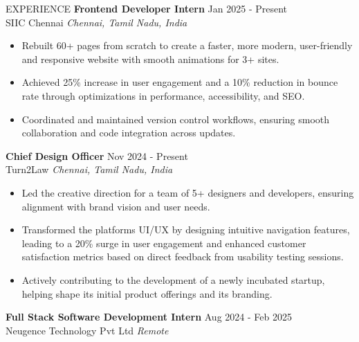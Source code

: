 \documentclass{resume} %
\begin{document}






\begin{rSection}{EXPERIENCE}
    \textbf{Frontend Developer Intern} \hfill Jan 2025 - Present\\
SIIC Chennai \hfill \textit{Chennai, Tamil Nadu, India}


\begin{itemize}
\itemsep -3pt{}
\item Rebuilt 60+ pages from scratch to create a faster, more modern, user-friendly and responsive website with smooth animations for 3+ sites.
\item Achieved 25\% increase in user engagement and a 10\% reduction in bounce rate through optimizations in performance, accessibility, and SEO.
\item Coordinated and maintained version control workflows, ensuring smooth collaboration and code integration across updates.
\end{itemize}
\textbf{Chief Design Officer} \hfill Nov 2024 - Present\\
Turn2Law \hfill \textit{Chennai, Tamil Nadu, India}


\begin{itemize}
\itemsep -3pt{}
\item Led the creative direction for a team of 5+ designers and developers, ensuring alignment with brand vision and user needs.
\item Transformed the platforms UI/UX by designing intuitive navigation features, leading to a 20\% surge in user engagement and enhanced customer satisfaction metrics based on direct feedback from usability testing sessions.
\item Actively contributing to the development of a newly incubated startup, helping shape its initial product offerings and its branding.
\end{itemize}
\textbf{Full Stack Software Development Intern} \hfill Aug 2024 - Feb 2025\\
Neugence Technology Pvt Ltd \hfill \textit{Remote}



\end{rSection}
\end{document}

